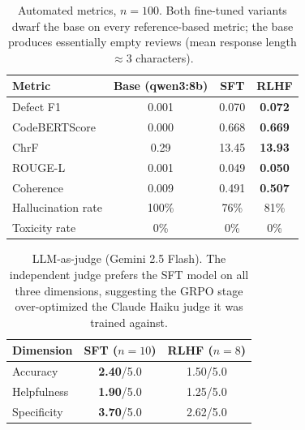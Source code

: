 \documentclass[11pt,a4paper]{article}
\begin{document}
\begin{table}[h]
\centering
\small
\begin{tabular}{@{}lccc@{}}
\toprule
\textbf{Metric}      & \textbf{Base (qwen3:8b)} & \textbf{SFT}    & \textbf{RLHF}    \\
\midrule
Defect F1            & 0.001                    & 0.070           & \textbf{0.072}  \\
CodeBERTScore        & 0.000                    & 0.668           & \textbf{0.669}  \\
ChrF                 & 0.29                     & 13.45           & \textbf{13.93}  \\
ROUGE-L              & 0.001                    & 0.049           & \textbf{0.050}  \\
Coherence            & 0.009                    & 0.491           & \textbf{0.507}  \\
Hallucination rate   & 100\%                    & 76\%            & 81\%            \\
Toxicity rate        & 0\%                      & 0\%             & 0\%             \\
\bottomrule
\end{tabular}
\caption{Automated metrics, $n=100$. Both fine-tuned variants dwarf the
base on every reference-based metric; the base produces essentially empty
reviews (mean response length $\approx 3$ characters).}
\label{tab:auto}
\end{table}

\begin{table}[h]
\centering
\small
\begin{tabular}{@{}lcc@{}}
\toprule
\textbf{Dimension}   & \textbf{SFT ($n=10$)} & \textbf{RLHF ($n=8$)} \\
\midrule
Accuracy             & \textbf{2.40}/5.0     & 1.50/5.0              \\
Helpfulness          & \textbf{1.90}/5.0     & 1.25/5.0              \\
Specificity          & \textbf{3.70}/5.0     & 2.62/5.0              \\
\bottomrule
\end{tabular}
\caption{LLM-as-judge (Gemini 2.5 Flash). The independent judge prefers the
SFT model on all three dimensions, suggesting the GRPO stage over-optimized
the Claude Haiku judge it was trained against.}
\label{tab:judge}
\end{table}
\end{document}

